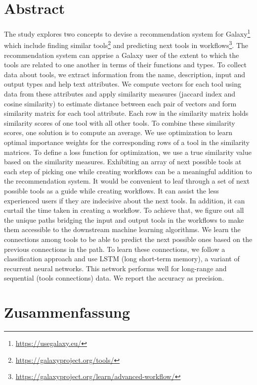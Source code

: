 \chapter*{Abstract}
The study explores two concepts to devise a recommendation system for Galaxy{\footnote{\url{https://usegalaxy.eu/}}} which include finding similar tools{\footnote{\url{https://galaxyproject.org/tools/}}} and predicting next tools in workflows{\footnote{\url{https://galaxyproject.org/learn/advanced-workflow/}}}. The recommendation system can apprise a Galaxy user of the extent to which the tools are related to one another in terms of their functions and types. To collect data about tools, we extract information from the name, description, input and output types and help text attributes. We compute vectors \cite{Foltz1996, DBLP:journals/corr/LeM14} for each tool using data from these attributes and apply similarity measures (jaccard index and cosine similarity) to estimate distance between each pair of vectors and form similarity matrix for each tool attribute. Each row in the similarity matrix holds similarity scores of one tool with all other tools. To combine these similarity scores, one solution is to compute an average. We use optimization \cite{KaoudiQTCA17} to learn optimal importance weights for the corresponding rows of a tool in the similarity matrices. To define a loss function for optimization, we use a true similarity value based on the similarity measures. Exhibiting an array of next possible tools at each step of picking one while creating workflows can be a meaningful addition to the recommendation system. It would be convenient to leaf through a set of next possible tools as a guide while creating workflows. It can assist the less experienced users if they are indecisive about the next tools. In addition, it can curtail the time taken in creating a workflow. To achieve that, we figure out all the unique paths bridging the input and output tools in the workflows to make them accessible to the downstream machine learning algorithms. We learn the connections among tools to be able to predict the next possible ones based on the previous connections in the path. To learn these connections, we follow a classification approach and use LSTM (long short-term memory), a variant of recurrent neural networks. This network performs well for long-range and sequential (tools connections) \cite{LiptonKEW15, SakSB14} data. We report the accuracy as precision.

\chapter*{Zusammenfassung}


